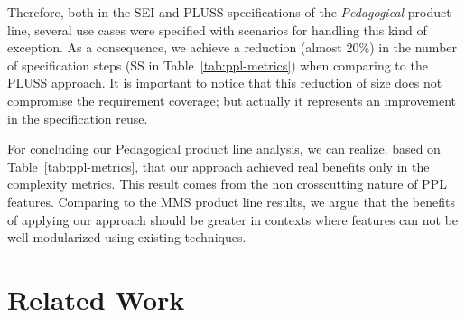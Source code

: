 \documentclass[11pt]{report}
\begin{document}
%    

Therefore, both in the SEI and PLUSS specifications of the \emph{Pedagogical} product line, several use cases were specified with scenarios for handling this kind of exception.
As a consequence, we achieve a reduction (almost 20\%) in the number of specification steps (SS in Table~\ref{tab:ppl-metrics}) when comparing to the PLUSS approach. It is important to notice that this reduction of size does not compromise the requirement coverage; but actually it represents an improvement in the specification reuse.

For concluding our Pedagogical product line analysis, we can realize, based on Table~\ref{tab:ppl-metrics}, that our approach achieved real benefits only in the complexity metrics. This result comes from the non crosscutting nature of PPL features. Comparing to the MMS product line results, we argue that the benefits of applying our approach should be greater in contexts where features can not be well modularized using existing techniques. 
   
\chapter{Related Work}
\label{sec:related}
\end{document}
